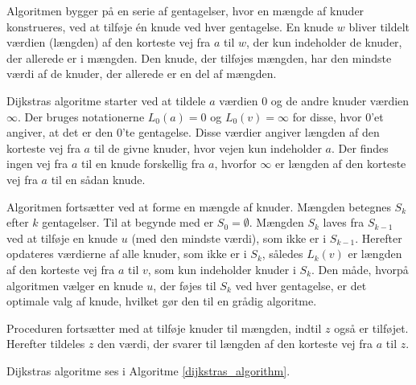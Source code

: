 Algoritmen bygger på en serie af gentagelser, hvor en mængde af knuder konstrueres, ved at tilføje én knude ved hver gentagelse. 
En knude $w$ bliver tildelt værdien (længden) af den korteste vej fra $a$ til $w$, der kun indeholder de knuder, der allerede er i mængden. 
Den knude, der tilføjes mængden, har den mindste værdi af de knuder, der allerede er en del af mængden.

Dijkstras algoritme starter ved at tildele $a$ værdien $0$ og de andre knuder værdien $\infty$. 
Der bruges notationerne $L_0(a)=0$ og $L_0(v)= \infty$ for disse, hvor $0$’et angiver, at det er den $0$'te gentagelse. 
Disse værdier angiver længden af den korteste vej fra $a$ til de givne knuder, hvor vejen kun indeholder $a$. 
Der findes ingen vej fra $a$ til en knude forskellig fra $a$, hvorfor $\infty$ er længden af den korteste vej fra $a$ til en sådan knude.

Algoritmen fortsætter ved at forme en mængde af knuder. Mængden betegnes $S_k$ efter $k$ gentagelser. 
Til at begynde med er $S_0=\emptyset$. 
Mængden $S_k$ laves fra $S_{k-1}$ ved at tilføje en knude $u$ (med den mindste værdi), som ikke er i $S_{k-1}$.
Herefter opdateres værdierne af alle knuder, som ikke er i $S_k$, således $L_k(v)$ er længden af den korteste vej fra $a$ til $v$, som kun indeholder knuder i $S_k$. 
Den måde, hvorpå algoritmen vælger en knude $u$, der føjes til $S_k$ ved hver gentagelse, er det optimale valg af knude, hvilket gør den til en grådig algoritme. 

Proceduren fortsætter med at tilføje knuder til mængden, indtil $z$ også er tilføjet.
Herefter tildeles $z$ den værdi, der svarer til længden af den korteste vej fra $a$ til $z$.

Dijkstras algoritme ses i Algoritme \ref{dijkstras_algorithm}.

